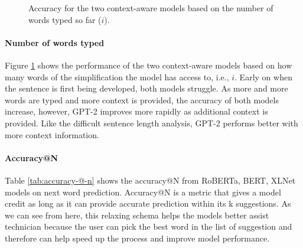 \documentclass[11pt]{article}
\begin{document}
\begin{figure}[t]
\caption{Accuracy for the two context-aware models based on the number of words typed so far ($i$).}
\label{fig:position_based}
\end{figure}

\paragraph{Number of words typed}
Figure \ref{fig:position_based} shows the performance of the two context-aware models based on how many words of the simplification the model has access to, i.e., $i$.  Early on when the sentence is first being developed, both models struggle.  As more and more words are typed and more context is provided, the accuracy of both models increase, however, GPT-2 improves more rapidly as additional context is provided. Like the difficult sentence length analysis, GPT-2 performs better with more context information.

\paragraph{Accuracy@N}

Table \ref{tab:accuracy-@-n} shows the accuracy@N from RoBERTa, BERT, XLNet models on next word prediction. Accuracy@N is a metric that gives a model credit as long as it can provide accurate prediction within its k suggestions. As we can see from here, this relaxing schema helps the models better assist technician because the user can pick the best word in the list of suggestion and therefore can help speed up the process and improve model performance.
\end{document}
